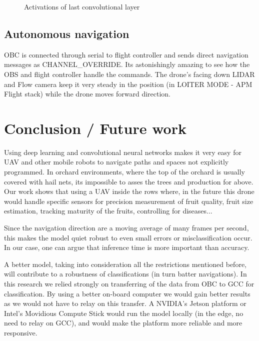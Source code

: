 \documentclass[conference]{IEEEtran}
\begin{document}
\begin{figure}
\centering
{}\par\medskip
{}\par\medskip
{}
  \caption{Activations of last convolutional layer}
\label{TS}
\end{figure}

\subsection{Autonomous navigation}
OBC is connected through serial to flight controller and sends direct navigation messages as CHANNEL\_OVERRIDE. Its astonishingly amazing to see how the OBS and flight controller handle the commands. The drone's facing down LIDAR and Flow camera keep it very steady in the position (in LOITER MODE - APM Flight stack) while the drone moves forward direction.

\section{Conclusion / Future work}
Using deep learning and convolutional neural networks makes it very easy for UAV and other mobile robots to navigate paths and spaces not explicitly programmed. In orchard environments, where the top of the orchard is usually covered with hail nets, its impossible to asses the trees and production for above. Our work shows that using a UAV inside the rows where, in the future this drone would handle specific sensors for precision measurement of fruit quality, fruit size estimation, tracking maturity of the fruits, controlling for diseases...

Since the navigation direction are a moving average of many frames per second, this makes the model quiet robust to even small errors or misclassification occur. In our case, one can argue that inference time is more important than accuracy.

A better model, taking into consideration all the restrictions mentioned before, will contribute to a robustness of classifications (in turn batter navigations). In this research we relied strongly on transferring of the data from OBC to GCC for classification. By using a better on-board computer we would gain better results as we would not have to relay on this transfer. A NVIDIA's Jetson platform or Intel's Movidious Compute Stick would run the model locally (in the edge, no need to relay on GCC), and would make the platform more reliable and more responsive.




\end{document}
